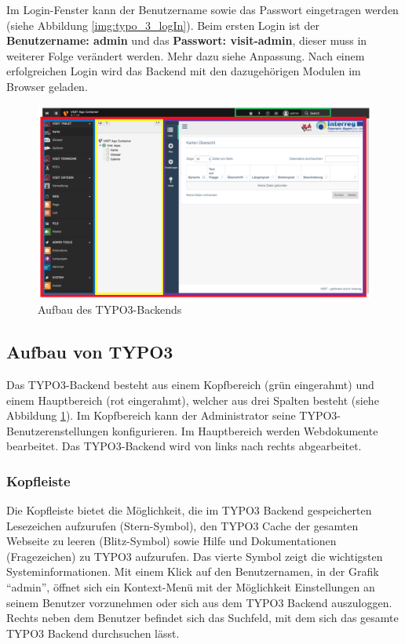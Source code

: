 Im Login-Fenster kann der Benutzername sowie das Passwort eingetragen werden (siehe Abbildung \ref{img:typo_3_logIn}). Beim ersten Login ist der \textbf{Benutzername: admin} und das \textbf{Passwort: visit-admin}, dieser muss in weiterer Folge verändert werden. Mehr dazu siehe Anpassung.
Nach einem erfolgreichen Login wird das Backend mit den dazugehörigen Modulen im Browser geladen.

\begin{figure}[ht!]
\centering
\includegraphics[width=12cm]{Figures/paula/typo3/aufbau_TYPO3.png}
\caption{Aufbau des TYPO3-Backends}
\label{img:typo_3_backend}
\end{figure}

\subsection{Aufbau von TYPO3}

Das TYPO3-Backend besteht aus einem Kopfbereich (grün eingerahmt) und einem Hauptbereich (rot eingerahmt), welcher aus drei Spalten besteht (siehe Abbildung \ref{img:typo_3_backend}). Im Kopfbereich kann der Administrator seine TYPO3-Benutzerenstellungen konfigurieren. Im Hauptbereich werden Webdokumente bearbeitet. Das TYPO3-Backend wird von links nach rechts abgearbeitet.

\subsubsection{Kopfleiste}

Die Kopfleiste bietet die Möglichkeit, die im TYPO3 Backend gespeicherten Lesezeichen aufzurufen (Stern-Symbol), den TYPO3 Cache der gesamten Webseite zu leeren (Blitz-Symbol) sowie Hilfe und Dokumentationen (Fragezeichen) zu TYPO3 aufzurufen. Das vierte Symbol zeigt die wichtigsten Systeminformationen. Mit einem Klick auf den Benutzernamen, in der Grafik “admin”, öffnet sich ein Kontext-Menü mit der Möglichkeit Einstellungen an seinem Benutzer vorzunehmen oder sich aus dem TYPO3 Backend auszuloggen. Rechts neben dem Benutzer befindet sich das Suchfeld, mit dem sich das gesamte TYPO3 Backend durchsuchen lässt.

